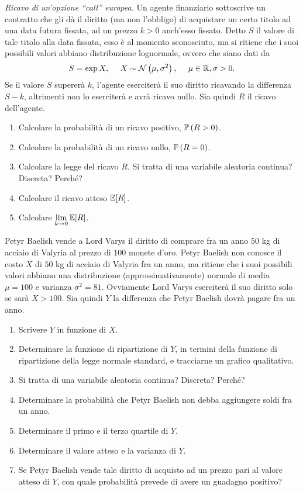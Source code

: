 \textit{Ricavo di un'opzione ``call'' europea.} Un agente finanziario sottoscrive un contratto che gli dà il diritto (ma non l'obbligo) di acquistare un certo titolo ad una data futura fissata, ad un prezzo $k >0$ anch'esso fissato. Detto $S$ il valore di tale titolo alla data fissata, esso è al momento sconosciuto, ma si ritiene che i suoi possibili valori abbiano distribuzione lognormale, ovvero che siano dati da
\begin{equation*}
S=\exp X,\ \ \ \ X\sim \mathcal{N}\left(\mu ,\sigma^{2}\right) ,\ \ \ \ \mu \in \mathbb{R} ,\sigma  >0.
\end{equation*}
Se il valore $S$ supererà $k$, l'agente eserciterà il suo diritto ricavando la differenza $S-k$, altrimenti non lo eserciterà e avrà ricavo nullo. Sia quindi $R$ il ricavo dell'agente.
\begin{enumerate}
\item Calcolare la probabilità di un ricavo positivo, $\mathbb{P}\left(R >0\right)$.
\item Calcolare la probabilità di un ricavo nullo, $\mathbb{P}\left(R=0\right)$.
\item Calcolare la legge del ricavo $R$. Si tratta di una variabile aleatoria continua? Discreta? Perché?
\item Calcolare il ricavo atteso $\mathbb{E}[R]$.
\item Calcolare $\lim\limits_{k\rightarrow 0}\mathbb{E}[R]$.
\end{enumerate}
\Esercizio{}

Petyr Baelish vende a Lord Varys il diritto di comprare fra un anno $50$ kg di acciaio di Valyria al prezzo di $100$ monete d'oro. Petyr Baelish non conosce il costo $X$ di $50$ kg di acciaio di Valyria fra un anno, ma ritiene che i suoi possibili valori abbiano una distribuzione (approssimativamente) normale di media $\mu =100$ e varianza $\sigma^{2} =81$. Ovviamente Lord Varys eserciterà il suo diritto solo se sarà $X >100$. Sia quindi $Y$ la differenza che Petyr Baelish dovrà pagare fra un anno.
\begin{enumerate}
\item Scrivere $Y$ in funzione di $X$.
\item Determinare la funzione di ripartizione di $Y$, in termini della funzione di ripartizione della legge normale standard, e tracciarne un grafico qualitativo.
\item Si tratta di una variabile aleatoria continua? Discreta? Perché?
\item Determinare la probabilità che Petyr Baelish non debba aggiungere soldi fra un anno.
\item Determinare il primo e il terzo quartile di $Y$.
\item Determinare il valore atteso e la varianza di $Y$.
\item Se Petyr Baelish vende tale diritto di acquisto ad un prezzo pari al valore atteso di $Y$, con quale probabilità prevede di avere un guadagno positivo?
\end{enumerate}
\Esercizio{}

